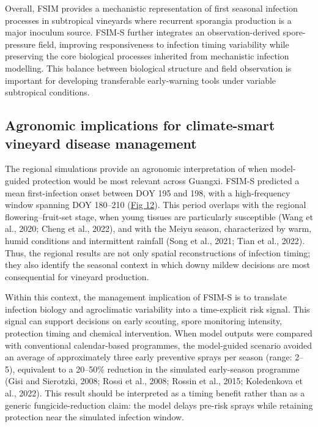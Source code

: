 \documentclass[
]{article}
\begin{document}
Overall, FSIM provides a mechanistic representation of first seasonal
infection processes in subtropical vineyards where recurrent sporangia
production is a major inoculum source. FSIM-S further integrates an
observation-derived spore-pressure field, improving responsiveness to
infection timing variability while preserving the core biological
processes inherited from mechanistic infection modelling. This balance
between biological structure and field observation is important for
developing transferable early-warning tools under variable subtropical
conditions.

\subsection{Agronomic implications for climate-smart vineyard disease
management}\label{agronomic-implications-for-climate-smart-vineyard-disease-management}

The regional simulations provide an agronomic interpretation of when
model-guided protection would be most relevant across Guangxi. FSIM-S
predicted a mean first-infection onset between DOY 195 and 198, with a
high-frequency window spanning DOY 180--210
(\hyperref[_Ref223011563]{Fig 12}). This period overlaps with the
regional flowering--fruit-set stage, when young tissues are particularly
susceptible (Wang et al., 2020; Cheng et al., 2022), and with the Meiyu
season, characterized by warm, humid conditions and intermittent
rainfall (Song et al., 2021; Tian et al., 2022). Thus, the regional
results are not only spatial reconstructions of infection timing; they
also identify the seasonal context in which downy mildew decisions are
most consequential for vineyard production.

Within this context, the management implication of FSIM-S is to
translate infection biology and agroclimatic variability into a
time-explicit risk signal. This signal can support decisions on early
scouting, spore monitoring intensity, protection timing and chemical
intervention. When model outputs were compared with conventional
calendar-based programmes, the model-guided scenario avoided an average
of approximately three early preventive sprays per season (range:
2--5), equivalent to a 20--50\% reduction in the simulated early-season
programme (Gisi and Sierotzki, 2008; Rossi et al., 2008; Rossin et al.,
2015; Koledenkova et al., 2022). This result should be interpreted as a
timing benefit rather than as a generic fungicide-reduction claim: the
model delays pre-risk sprays while retaining protection near the
simulated infection window.
\end{document}
